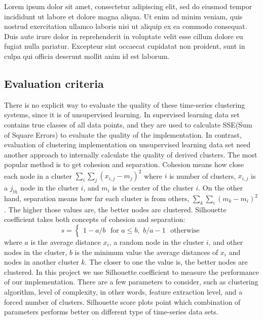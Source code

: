 \documentclass{article}
\begin{document}
Lorem ipsum dolor sit amet, consectetur adipiscing elit, sed do eiusmod tempor incididunt ut labore et dolore magna aliqua. Ut enim ad minim veniam, quis nostrud exercitation ullamco laboris nisi ut aliquip ex ea commodo consequat. Duis aute irure dolor in reprehenderit in voluptate velit esse cillum dolore eu fugiat nulla pariatur. Excepteur sint occaecat cupidatat non proident, sunt in culpa qui officia deserunt mollit anim id est laborum.

\subsection{Evaluation criteria}
There is no explicit way to evaluate the quality of these time-series clustering systems, since it is of unsupervised learning. In supervised learning data set contains true classes of all data points, and they are used to calculate SSE(Sum of Square Errors) to evaluate the quality of the implementation. In contrast, evaluation of clustering implementation on unsupervised learning data set need another approach to internally calculate the quality of derived clusters. The most popular method is to get cohesion and separation. Cohesion means how close each node in a cluster $\sum_{i} \sum_{j} (x_{i,j}-m_j)^2$ where $i$ is number of clusters, $x_{i,j}$ is a $j_{th}$ node in the cluster $i$, and $m_{i}$ is the center of the cluster $i$. On the other hand, separation means how far each cluster is from others, $\sum_{k} \sum_{i} (m_{k}-m_{i})^2$. The higher those values are, the better nodes are clustered.
Silhouette coefficient takes both concepts of cohesion and separation:\\
\begin{equation}
s = \begin{cases}
1-a/b  \,\,\,\, \mbox{for $a \le b$}  ,\,\,
b/a-1  \,\,\,\, \mbox{otherwise}
\end{cases}
\end{equation}
where $a$ is the average distance $x_{i}$, a random node in the cluster $i$, and other nodes in the cluster, $b$ is the minimum value the average distances of $x_{i}$ and nodes in another cluster $k$. The closer to one the value is, the better nodes are clustered.
In this project we use Silhouette coefficient to measure the performance of our implementation. There are a few parameters to consider, such as clustering algorithm, level of complexity, in other words, feature extraction level, and a forced number of clusters. Silhouette score plots point which combination of parameters performs better on different type of time-series data sets.
\end{document}
